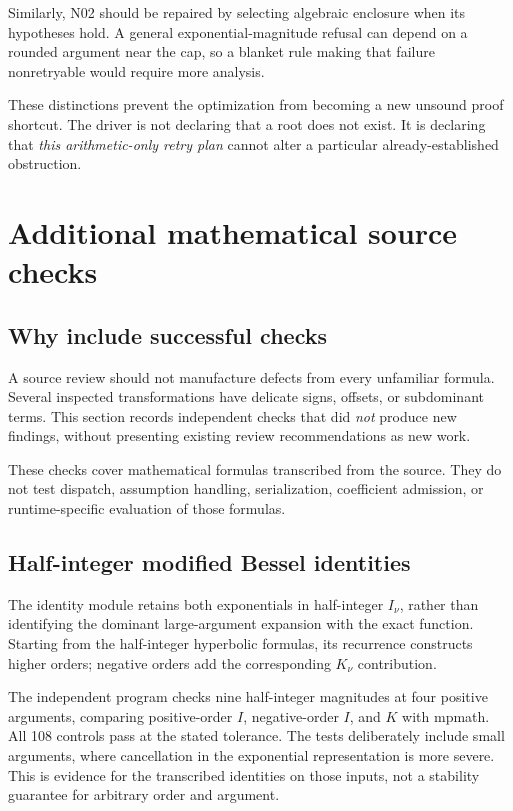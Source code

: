 \documentclass[11pt,a4paper]{article}
\begin{document}
Similarly, N02 should be repaired by selecting algebraic enclosure when its hypotheses hold. A general exponential-magnitude refusal can depend on a rounded argument near the cap, so a blanket rule making that failure nonretryable would require more analysis.

These distinctions prevent the optimization from becoming a new unsound proof shortcut. The driver is not declaring that a root does not exist. It is declaring that \emph{this arithmetic-only retry plan} cannot alter a particular already-established obstruction.

\section{Additional mathematical source checks}
\subsection{Why include successful checks}

A source review should not manufacture defects from every unfamiliar formula. Several inspected transformations have delicate signs, offsets, or subdominant terms. This section records independent checks that did \emph{not} produce new findings, without presenting existing review recommendations as new work.

These checks cover mathematical formulas transcribed from the source. They do not test dispatch, assumption handling, serialization, coefficient admission, or runtime-specific evaluation of those formulas.

\subsection{Half-integer modified Bessel identities}

The identity module retains both exponentials in half-integer $I_\nu$, rather than identifying the dominant large-argument expansion with the exact function. Starting from the half-integer hyperbolic formulas, its recurrence constructs higher orders; negative orders add the corresponding $K_\nu$ contribution.\cite{identities,dlmfbessel}

The independent program checks nine half-integer magnitudes at four positive arguments, comparing positive-order $I$, negative-order $I$, and $K$ with mpmath. All 108 controls pass at the stated tolerance. The tests deliberately include small arguments, where cancellation in the exponential representation is more severe. This is evidence for the transcribed identities on those inputs, not a stability guarantee for arbitrary order and argument.
\end{document}
